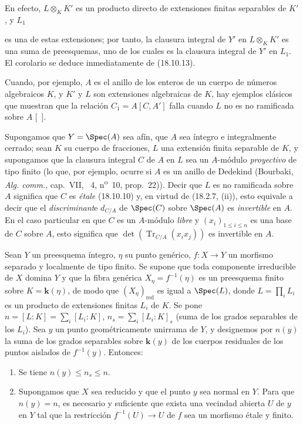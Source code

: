 En efecto, $L\otimes_K K'$ es un producto directo de extensiones finitas separables de $K'$, y $L_1$


es una de estas extensiones; por tanto, la clausura integral de $Y'$ en $L\otimes_K K'$ es una suma de preesquemas, uno de los cuales es la clausura integral de $Y'$ en $L_1$. El corolario se deduce inmediatamente de (18.10.13).

Cuando, por ejemplo, $A$ es el anillo de los enteros de un cuerpo de números algebraicos $K$, y $K'$ y $L$ son extensiones algebraicas de $K$, hay ejemplos clásicos que muestran que la relación $C_1=A[C,A']$ falla cuando $L$ no es no ramificada sobre $A$ [\ ].

\begin{env}[18.10.15]
\label{IV.18.10.15}
Supongamos que $Y=\Spec(A)$ sea afín, que $A$ sea íntegro e integralmente cerrado; sean $K$ su cuerpo de fracciones, $L$ una extensión finita separable de $K$, y supongamos que la clausura integral $C$ de $A$ en $L$ sea un $A$-módulo \emph{proyectivo} de tipo finito (lo que, por ejemplo, ocurre si $A$ es un anillo de Dedekind (Bourbaki, \emph{Alg. comm.}, cap.~VII, \textsection~4, n\textsuperscript{o}~10, prop.~22)). Decir que $L$ es no ramificada sobre $A$ significa que $C$ es \emph{étale} (18.10.10) y, en virtud de (18.2.7, (ii)), esto equivale a decir que el \emph{discriminant}e $d_{C/A}$ de $\Spec(C)$ sobre $\Spec(A)$ es \emph{invertible} en $A$. En el caso particular en que $C$ es un $A$-módulo \emph{libre} y $(x_i)_{1\leq i\leq n}$ es una base de $C$ sobre $A$, esto significa que $\det(\operatorname{Tr}_{C/A}(x_ix_j))$ es invertible en $A$.
\end{env}

\begin{theorem}[18.10.16]
\label{IV.18.10.16}
Sean $Y$ un preesquema íntegro, $\eta$ su punto genérico, $f:X\to Y$ un morfismo separado y localmente de tipo finito. Se supone que toda componente irreducible de $X$ domina $Y$ y que la fibra genérica $X_\eta=f^{-1}(\eta)$ es un preesquema finito sobre $K=\boldsymbol{k}(\eta)$, de modo que $(X_\eta)_{\mathrm{red}}$ es igual a $\Spec(L)$, donde $L=\prod_iL_i$ es un producto de extensiones finitas $L_i$ de $K$. Se pone
$n=[L:K]=\sum_i[L_i:K]$, $n_s=\sum_i[L_i:K]_s$ \textup{(suma de los grados separables de los $L_i$)}.
Sea $y$ un punto \textup{geométricamente unirrama} de $Y$, y designemos por $n(y)$ la suma de los grados separables sobre $\boldsymbol{k}(y)$ de los cuerpos residuales de los puntos \textup{aislados} de $f^{-1}(y)$. Entonces:
\begin{enumerate}
  \item[\textup{(i)}] Se tiene $n(y)\leq n_s\leq n$.
  \item[\textup{(ii)}] Supongamos que $X$ sea reducido y que el punto $y$ sea normal en $Y$. Para que $n(y)=n$, es necesario y suficiente que exista una vecindad abierta $U$ de $y$ en $Y$ tal que la restricción $f^{-1}(U)\to U$ de $f$ sea un morfismo étale y finito.
\end{enumerate}
\end{theorem}


